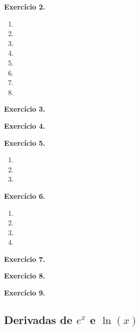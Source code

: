 \documentclass[12pt,a4paper]{article}
\begin{document}
\vspace{0.5cm}
\noindent\textbf{Exercício 2.}
\begin{enumerate}
    \renewcommand{\theenumi}{\alph{enumi}}
    \renewcommand{\labelenumi}{\theenumi)}
    \item 
    \item 
    \item 
    \item 
    \item 
    \item 
    \item 
    \item 
\end{enumerate}

\vspace{0.5cm}
\noindent\textbf{Exercício 3.}

\vspace{0.5cm}
\noindent\textbf{Exercício 4.}

\vspace{0.5cm}
\noindent\textbf{Exercício 5.}
\begin{enumerate}
    \renewcommand{\theenumi}{\alph{enumi}}
    \renewcommand{\labelenumi}{\theenumi)}
    \item 
    \item 
    \item 
\end{enumerate}

\vspace{0.5cm}
\noindent\textbf{Exercício 6.}
\begin{enumerate}
    \renewcommand{\theenumi}{\alph{enumi}}
    \renewcommand{\labelenumi}{\theenumi)}
    \item 
    \item 
    \item 
    \item 
\end{enumerate}

\vspace{0.5cm}
\noindent\textbf{Exercício 7.}

\vspace{0.5cm}
\noindent\textbf{Exercício 8.}

\vspace{0.5cm}
\noindent\textbf{Exercício 9.}

\subsection{Derivadas de $e^x$ e $\ln(x)$}
\end{document}

